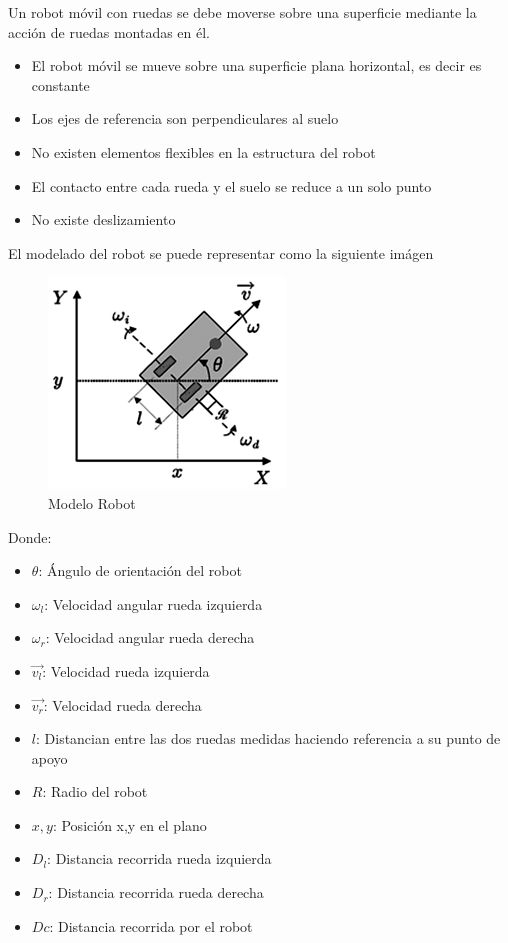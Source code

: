 \documentclass[oneside,twocolumn]{article}
\begin{document}
Un robot móvil con ruedas se debe moverse sobre una superficie mediante la acción de ruedas montadas en él.
\begin{itemize}
\item El robot móvil se mueve sobre una superficie plana horizontal, es decir es constante
\item Los ejes de referencia son perpendiculares al suelo
\item No existen elementos flexibles en la estructura del robot
\item El contacto entre cada rueda y el suelo se reduce a un solo punto
\item No existe deslizamiento
\end{itemize}

El modelado del robot se puede representar como la siguiente imágen

\begin{figure}[h]
  \centering
  \includegraphics[scale=0.6]{graficos/odometria.png}
  \caption{Modelo Robot}
\end{figure}

Donde:
\begin{itemize}
\item \textbf{$\theta$}: Ángulo de orientación del robot
\item \textbf{$\omega_{l}$}: Velocidad angular rueda izquierda
\item \textbf{$\omega_{r}$}: Velocidad angular rueda derecha
\item \textbf{$\vec{v_{l}}$}: Velocidad rueda izquierda
\item \textbf{$\vec{v_{r}}$}: Velocidad rueda derecha
\item \textbf{$l$}: Distancian entre las dos ruedas medidas haciendo referencia a su punto de apoyo
\item $R$: Radio del robot
\item $x,y$: Posición x,y en el plano
\item \textbf{$D_{l}$}: Distancia recorrida rueda izquierda
\item \textbf{$D_{r}$}: Distancia recorrida rueda derecha
\item \textbf{$Dc$}: Distancia recorrida por el robot
\end{itemize}
\end{document}
